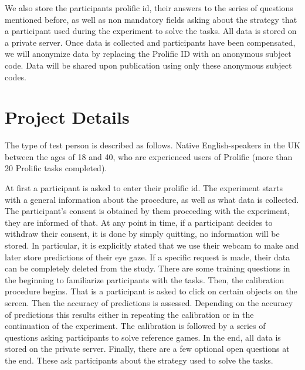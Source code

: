 \documentclass[11pt,a4paper]{article}
\begin{document}
We also store the participants prolific id, their answers to the series of questions mentioned before, as well as non mandatory fields asking about the strategy that a participant used during the experiment to solve the tasks. All data is stored on a private server. Once data is collected and participants have been compensated, we will anonymize data by replacing the Prolific ID with an anonymous subject code. Data will be shared upon publication using only these anonymous subject codes.


\section{Project Details}
The type of test person is described as follows. Native English-speakers in the UK between the ages of 18 and 40, who are experienced users of Prolific (more than 20 Prolific tasks completed).

At first a participant is asked to enter their prolific id. The experiment starts with a general information about the procedure, as well as what data is collected. The participant's consent is obtained by them proceeding with the experiment, they are informed of that. At any point in time, if a participant decides to withdraw their consent, it is done by simply quitting, no information will be stored. In particular, it is explicitly stated that we use their webcam to make and later store predictions of their eye gaze. If a specific request is made, their data can be completely deleted from the study. There are some training questions in the beginning to familiarize participants with the tasks. Then, the calibration procedure begins. That is a participant is asked to click on certain objects on the screen. Then the accuracy of predictions is assessed. Depending on the accuracy of predictions this results either in repeating the calibration or in the continuation of the experiment. The calibration is followed by a series of questions asking participants to solve reference games. In the end, all data is stored on the private server. Finally, there are a few optional open questions at the end. These ask participants about the strategy used to solve the tasks.
\end{document}
